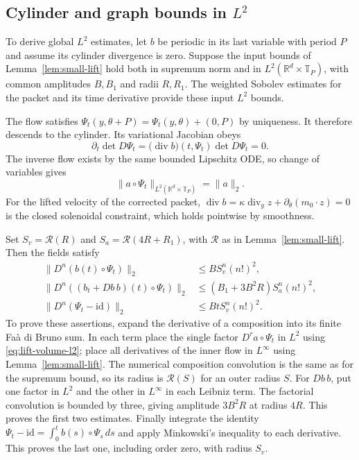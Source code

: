\documentclass[11pt]{article}
\newcommand{\R}{\mathbb R}
\theoremstyle{definition}
\begin{document}
\subsection{Cylinder and graph bounds in \texorpdfstring{$L^2$}{L2}}
To derive global $L^2$ estimates, let $b$ be periodic in its last
variable with period $P$ and assume its cylinder divergence is zero. Suppose the input bounds
of Lemma~\ref{lem:small-lift} hold both in supremum norm and in
$L^2(\R^d\times\mathbb T_P)$, with common amplitudes $B,B_1$ and
radii $R,R_1$. The weighted Sobolev estimates for the packet and its time derivative
provide these input $L^2$ bounds.

The flow satisfies
$\Psi_t(y,\theta+P)=\Psi_t(y,\theta)+(0,P)$ by uniqueness.
It therefore descends to the cylinder. Its variational Jacobian obeys
\[
 \partial_t\det D\Psi_t
       =\bigl(\operatorname{div}b\bigr)(t,\Psi_t)\det D\Psi_t=0.
\]
The inverse flow exists by the same bounded Lipschitz ODE, so change of
variables gives
\begin{equation}\label{eq:lift-volume-l2}
 \|a\circ\Psi_t\|_{L^2(\R^d\times\mathbb T_P)}=\|a\|_2.
\end{equation}
For the lifted velocity of the corrected packet,
$\operatorname{div}b=\kappa\operatorname{div}_y z+
\partial_\theta(m_0\cdot z)=0$ is the closed solenoidal constraint, which holds pointwise by
smoothness.

Set $S_v=\mathscr R(R)$ and $S_a=\mathscr R(4R+R_1)$, with
$\mathscr R$ as in Lemma~\ref{lem:small-lift}. Then the fields
satisfy
\begin{align}
 \|D^n(b(t)\circ\Psi_t)\|_2
    &\le B S_v^n(n!)^2,\label{eq:lift-velocity-l2}\\
 \|D^n((b_t+Db\,b)(t)\circ\Psi_t)\|_2
    &\le(B_1+3B^2R)S_a^n(n!)^2,\label{eq:lift-acceleration-l2}\\
 \|D^n(\Psi_t-\mathrm{id})\|_2
    &\le Bt S_v^n(n!)^2.\label{eq:lift-displacement-l2}
\end{align}
To prove these assertions, expand the derivative of a composition into
its finite Fa\`a di Bruno sum. In each term place the single factor
$D^r a\circ\Psi_t$ in $L^2$ using \eqref{eq:lift-volume-l2}; place
all derivatives of the inner flow in $L^\infty$ using
Lemma~\ref{lem:small-lift}. The numerical composition convolution is
the same as for the supremum bound, so its radius is
$\mathscr R(S)$ for an outer radius $S$. For $Db\,b$, put one factor
in $L^2$ and the other in $L^\infty$ in each Leibniz term.
The factorial convolution is bounded by three, giving amplitude
$3B^2R$ at radius $4R$. This proves the first two estimates.
Finally integrate the identity
$\Psi_t-\mathrm{id}=\int_0^t b(s)\circ\Psi_s\,ds$ and apply
Minkowski's inequality to each derivative. This proves the last one,
including order zero, with radius $S_v$.
\end{document}
